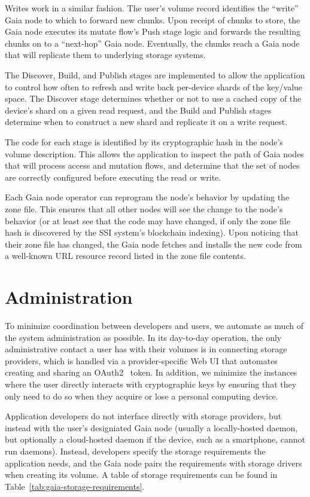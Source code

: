 Writes work in a similar fashion.  The user's volume record identifies the
``write'' Gaia node to which to forward new chunks.  Upon receipt of chunks to
store, the Gaia node executes its mutate flow's Push stage logic and forwards the
resulting chunks on to a ``next-hop'' Gaia node.  Eventually, the chunks reach a Gaia
node that will replicate them to underlying storage systems.

The Discover, Build, and Publish stages are implemented to allow the application
to control how often to refresh and write back per-device shards of the
key/value space.  The Discover stage determines whether or not to use a cached
copy of the device's shard on a given read request, and the Build and Publish stages determine when to
construct a new shard and replicate it on a write request.

The code for each stage is identified by its cryptographic hash in the node's
volume description.  This allows the application to inspect the path of Gaia nodes that
will process access and mutation flows, and determine that the set of nodes are
correctly configured before executing the read or write.

Each Gaia node operator can reprogram the node's behavior by updating the zone file.
This ensures that all other nodes will see the change to the node's behavior (or
at least see that the code may have changed, if only the zone file hash is
discovered by the SSI system's blockchain indexing).  Upon noticing that their
zone file has changed, the Gaia node fetches and installs the new code from a
well-known URL resource record listed in the zone file contents.

\section{Administration}

To minimize coordination between developers and users, we
automate as much of the system administration as possible.
In its day-to-day operation, the only administrative contact a user has with their volumes is
in connecting storage providers, which is handled via a provider-specific Web UI
that automates creating and sharing an OAuth2~\cite{oauth2} token.  In addition,
we minimize the instances where the user directly interacts with cryptographic keys
by ensuring that they only need to do so when they acquire or lose a personal
computing device.

Application developers do not interface directly with storage providers, but
instead with the user's designiated Gaia node (usually a locally-hosted daemon,
but optionally a cloud-hosted daemon if the device, such as a smartphone, cannot
run daemons).  Instead, developers specify the storage requirements the
application needs, and the Gaia node pairs the requirements with storage drivers
when creating its volume.  A table of storage requirements can be found in
Table~\ref{tab:gaia-storage-requirements}.

